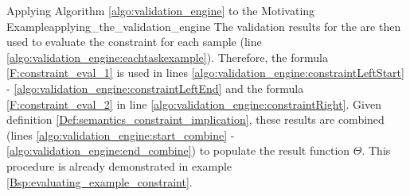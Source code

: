 \begin{Bsp}{Applying Algorithm \ref{algo:validation_engine} to the Motivating Example}{applying_the_validation_engine}
        The validation results for the  are then used to evaluate the constraint for each sample (line \ref{algo:validation_engine:eachtaskexample}). Therefore, the formula \ref{F:constraint_eval_1} is used in lines \ref{algo:validation_engine:constraintLeftStart} - \ref{algo:validation_engine:constraintLeftEnd} and the formula \ref{F:constraint_eval_2} in line \ref{algo:validation_engine:constraintRight}. Given definition \ref{Def:semantics_constraint_implication}, these results are combined (lines \ref{algo:validation_engine:start_combine} - \ref{algo:validation_engine:end_combine}) to populate the result function $\Theta$. This procedure is already demonstrated in example \ref{Bsp:evaluating_example_constraint}.
    \end{Bsp}
